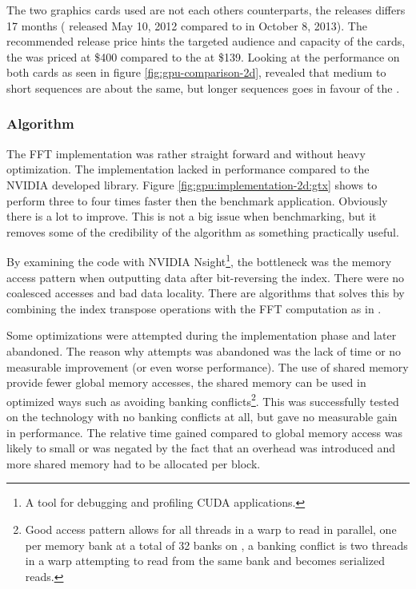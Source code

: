 The two graphics cards used are not each others counterparts, the releases differs 17 months ({\NVCARD} released May 10, 2012 compared to {\AMDCARD} in October 8, 2013). The recommended release price hints the targeted audience and capacity of the cards, the {\NVCARD} was priced at \$400 compared to the {\AMDCARD} at \$139. Looking at the {\OCL} performance on both cards as seen in figure \ref{fig:gpu-comparison-2d}, revealed that medium to short sequences are about the same, but longer sequences goes in favour of the {\NVCARD}.

\subsubsection{Algorithm}

The \gls{FFT} implementation was rather straight forward and without heavy optimization. The implementation lacked in performance compared to the NVIDIA developed {\CUFFT} library. Figure \ref{fig:gpu:implementation-2d:gtx} shows {\CUFFT} to perform three to four times faster then the benchmark application. Obviously there is a lot to improve. This is not a big issue when benchmarking, but it removes some of the credibility of the algorithm as something practically useful.

By examining the code with NVIDIA Nsight\footnote{A tool for debugging and profiling CUDA applications.}, the bottleneck was the memory access pattern when outputting data after bit-reversing the index. There were no coalesced accesses and bad data locality. There are algorithms that solves this by combining the index transpose operations with the FFT computation as in \cite{govindaraju2008high}.

Some optimizations were attempted during the implementation phase and later abandoned. The reason why attempts was abandoned was the lack of time or no measurable improvement (or even worse performance). The use of shared memory provide fewer global memory accesses, the shared memory can be used in optimized ways such as avoiding banking conflicts\footnote{Good access pattern allows for all threads in a warp to read in parallel, one per memory bank at a total of 32 banks on {\NVCARD}, a banking conflict is two threads in a warp attempting to read from the same bank and becomes serialized reads.}. This was successfully tested on the {\CU} technology with no banking conflicts at all, but gave no measurable gain in performance. The relative time gained compared to global memory access was likely to small or was negated by the fact that an overhead was introduced and more shared memory had to be allocated per block.


